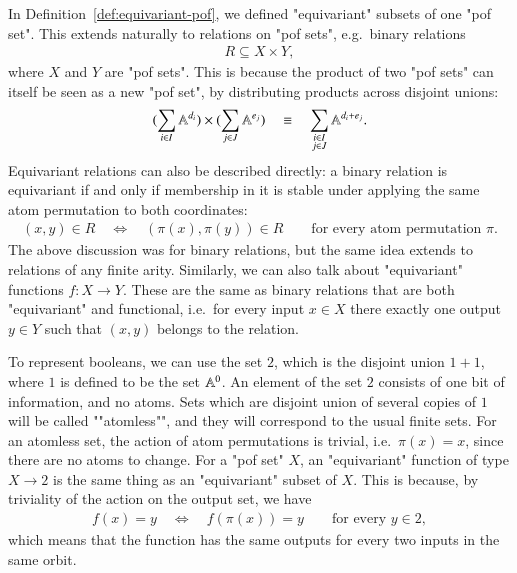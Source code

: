 In Definition~\ref{def:equivariant-pof}, we defined "equivariant" subsets of one "pof set". This extends naturally to relations on "pof sets", e.g.~binary relations 
\begin{align*}
R \subseteq X \times Y,
\end{align*}
where $X$ and $Y$ are "pof sets". This is because the product of two "pof sets" can itself be seen as a new "pof set", by distributing products across disjoint unions:
\begin{align*}
(\sum_{i \in I} \mathbb A^{d_i})
\times 
(\sum_{j \in J} \mathbb A^{e_j})
\quad \equiv \quad 
\sum_{\substack{ i \in I \\ j \in J}} \mathbb A^{d_i + e_j}.
\end{align*}
Equivariant relations can also be described directly: a binary relation is equivariant if and only if  membership in it is stable under applying the same atom permutation to both coordinates:
\begin{align*}
(x,y) \in R 
\quad \Leftrightarrow \quad 
(\pi(x),\pi(y)) \in R
\qquad 
\text{for every atom permutation $\pi$.}
\end{align*}
The above discussion was for binary relations, but the same idea extends to relations of any finite arity.
Similarly, we can also talk about "equivariant" functions $f : X \to Y$. These are the same as binary relations that are both "equivariant" and functional, i.e.~for every input $x \in X$ there exactly one output $y \in Y$ such that $(x,y)$ belongs to the relation. 

\begin{myexample}\label{ex:functions-with-boolean-outputs}
    To represent booleans, we can use the set $2$, which is the disjoint union $1+1$, where $1$ is defined to be the set $\mathbb A^0$. An element of the  set $2$ consists of one bit of information, and no atoms. Sets which are disjoint union of several copies of $1$ will be called ""atomless"", and they will correspond to the usual finite sets. For an atomless set, the action of atom permutations is trivial, i.e.~$\pi(x)=x$, since there are no atoms to change. 
For a "pof set" $X$, an "equivariant" function of type $X \to 2$ is the same thing as an "equivariant" subset of $X$. This is because, by triviality of the action on the output set, we have 
\begin{align*}
f(x) = y \quad \Leftrightarrow \quad f(\pi(x)) = y \qquad \text{for every $y \in 2$},
\end{align*}
which means that the function has the same outputs for every two inputs in the same orbit.
\end{myexample}

